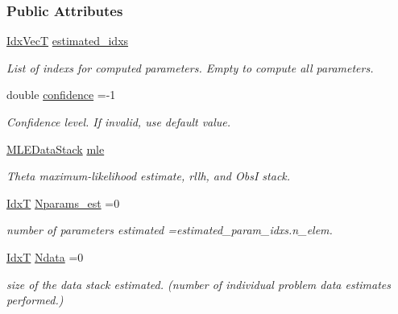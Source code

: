\subsubsection*{Public Attributes}
\begin{DoxyCompactItemize}
\item 
\hyperlink{namespacemappel_ac63743dcd42180127307cd0e4ecdd784}{Idx\+VecT} \hyperlink{structmappel_1_1estimator_1_1ProfileBoundsDataStack_a695c3ae49b7d9aa845cf727c269abbd4}{estimated\+\_\+idxs}
\begin{DoxyCompactList}\small\item\em List of indexs for computed parameters. Empty to compute all parameters. \end{DoxyCompactList}\item 
double \hyperlink{structmappel_1_1estimator_1_1ProfileBoundsDataStack_ac6e9709cd01fe1814dcaeaff4445c0a9}{confidence} =-\/1
\begin{DoxyCompactList}\small\item\em Confidence level. If invalid, use default value. \end{DoxyCompactList}\item 
\hyperlink{namespacemappel_1_1estimator_structmappel_1_1estimator_1_1MLEDataStack}{M\+L\+E\+Data\+Stack} \hyperlink{structmappel_1_1estimator_1_1ProfileBoundsDataStack_a2960e31d721096fd44d5ca4dd652a5a9}{mle}
\begin{DoxyCompactList}\small\item\em Theta maximum-\/likelihood estimate, rllh, and ObsI stack. \end{DoxyCompactList}\item 
\hyperlink{namespacemappel_ab17ec0f30b61ece292439d7ece81d3a8}{IdxT} \hyperlink{structmappel_1_1estimator_1_1ProfileBoundsDataStack_ae99f72e8d82cabed72b22fd6200c7322}{Nparams\+\_\+est} =0
\begin{DoxyCompactList}\small\item\em number of parameters estimated =estimated\+\_\+param\+\_\+idxs.\+n\+\_\+elem. \end{DoxyCompactList}\item 
\hyperlink{namespacemappel_ab17ec0f30b61ece292439d7ece81d3a8}{IdxT} \hyperlink{structmappel_1_1estimator_1_1ProfileBoundsDataStack_ad3883bc3355fbde3dd47eb3dac23785e}{Ndata} =0
\begin{DoxyCompactList}\small\item\em size of the data stack estimated. (number of individual problem data estimates performed.) \end{DoxyCompactList}\item 

\end{DoxyCompactItemize}
